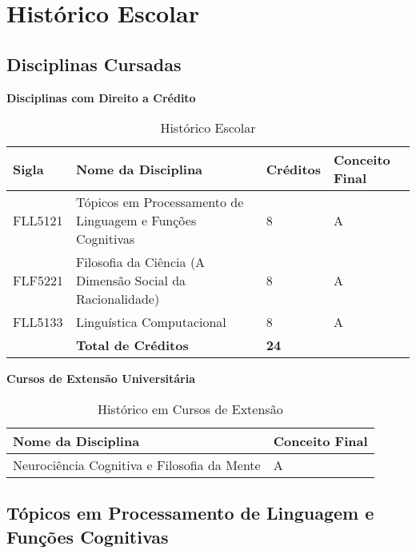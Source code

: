 \chapter{Histórico Escolar}
\label{ch:01-historicoescolar}

\section{Disciplinas Cursadas}

\textbf{\Large Disciplinas com Direito a Crédito}\\

\begin{table}[ht!]
\center
\begin{tabular}{llll}
\textbf{Sigla}       & \textbf{Nome da Disciplina}                                         & \textbf{Créditos} & \textbf{Conceito Final} \\
\midrule
FLL5121 & Tópicos em Processamento de Linguagem e Funções Cognitivas & 8        & A              \\
FLF5221 & Filosofia da Ciência (A Dimensão Social da Racionalidade)   & 8        & A              \\
FLL5133 & Linguística Computacional                                  & 8        & A              \\
\midrule
            & \textbf{Total de Créditos}                                          & \textbf{24}       &               
\end{tabular}
\caption{Histórico Escolar}
\label{tab:historico}
\end{table}

\textbf{\Large Cursos de Extensão Universitária}\\

\begin{table}[h]
\begin{tabular}{ll}
\textbf{Nome da Disciplina}                 & \textbf{Conceito Final} \\
\midrule
Neurociência Cognitiva e Filosofia da Mente & A                      
\end{tabular}
\caption{Histórico em Cursos de Extensão}
\label{tab:cursosextra}
\end{table}

\section{Tópicos em Processamento de Linguagem e Funções Cognitivas}

